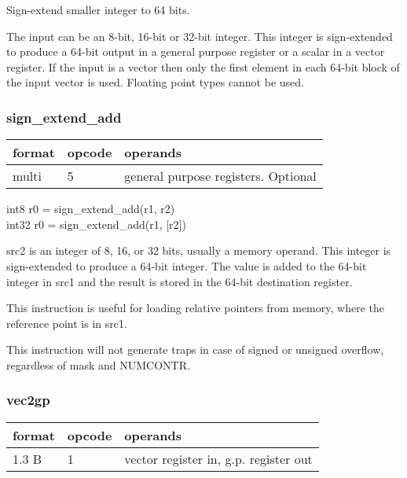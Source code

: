 \documentclass[forwardcom.tex]{subfiles}
\begin{document}
Sign-extend smaller integer to 64 bits.

\vspace{2mm}
The input can be an 8-bit, 16-bit or 32-bit integer. This integer is sign-extended to produce a 64-bit output in a general purpose register or a scalar in a vector register. If the input is a vector then only the first element in each 64-bit block of the input vector is used. Floating point types cannot be used.

\subsubsection{sign\_extend\_add}
\label{table:signExtendAddInstruction}
\begin{tabular}{|p{12mm}|p{12mm}|p{110mm}|}
\hline
\bfseries format & \bfseries opcode & \bfseries operands \\ \hline
multi & 5 & general purpose registers. Optional \\ \hline
\end{tabular}
\vspace{2mm}

int8 r0 = sign\_extend\_add(r1, r2) \\ 
int32 r0 = sign\_extend\_add(r1, [r2])
\vspace{2mm}

src2 is an integer of 8, 16, or 32 bits, usually a memory operand.
This integer is sign-extended to produce a 64-bit integer. The value is added to the 
64-bit integer in src1 and the result is stored in the 64-bit destination register.
\vspace{2mm}

This instruction is useful for loading relative pointers from memory, where the reference
point is in src1.
\vspace{2mm}

This instruction will not generate traps in case of signed or unsigned overflow, regardless of mask and  NUMCONTR.
\vspace{2mm}


\subsubsection{vec2gp}
\label{table:vec2gpInstruction}
\begin{tabular}{|p{12mm}|p{12mm}|p{110mm}|}
\hline
\bfseries format & \bfseries opcode & \bfseries operands \\ \hline
1.3 B & 1 & vector register in, g.p. register out \\ \hline
\end{tabular}
\vspace{2mm}
\end{document}

